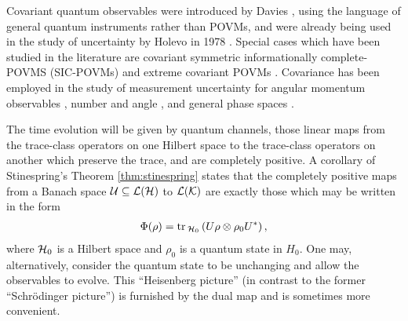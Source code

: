Covariant quantum observables were introduced by Davies \cite{DAVIES1970318}, using the language of general quantum instruments rather than POVMs, and were already being used in the study of uncertainty by Holevo in 1978 \cite{HOLEVO1979385}. Special cases which have been studied in the literature are covariant symmetric informationally complete-POVMS (SIC-POVMs) \cites{doi:10.1063/1.1896384}{doi:10.1063/1.1737053} and extreme covariant POVMs \cites{doi:10.1063/1.2940328}{doi:10.1063/1.3668317}{doi:10.1063/1.1806262}{erkka-thesis}. Covariance has been employed in the study of measurement uncertainty for angular momentum observables \cite{dsw-meas-ur-ang-mom}, number and angle \cite{sharp-ur-num-angle}, and general phase spaces \cite{Werner2016}.



The time evolution will be given by quantum channels, those linear maps from the trace-class operators on one Hilbert space to the trace-class operators on another which preserve the trace, and are completely positive. A corollary of Stinespring's Theorem \ref{thm:stinespring} states that the completely positive maps from a Banach space $\ucal\subseteq\bops[\hcal]$ to $\bops[\mathcal{K}]$ are exactly those which may be written in the form
\begin{align}
  \Phi(\rho) = \tr{U \rho\otimes\rho_0 U^*}[\hcal_0],
\end{align}
where $\mathcal{H}_0$ is a Hilbert space and $\rho_0$ is a quantum state in $H_0$. One may, alternatively, consider the quantum state to be unchanging and allow the observables to evolve. This ``Heisenberg picture'' (in contrast to the former ``Schr\"odinger picture'') is furnished by the dual map and is sometimes more convenient.

